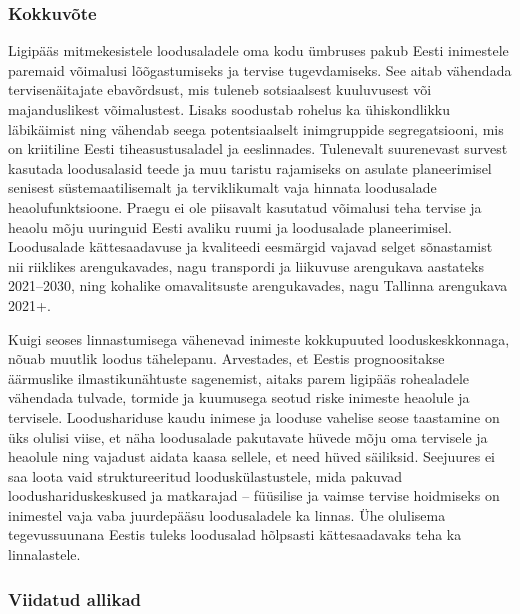 \documentclass[estonian,]{article}
\begin{document}
\hypertarget{kokkuvuxf5te-8}{%
\subsubsection*{Kokkuvõte}\label{kokkuvuxf5te-8}}

Ligipääs mitmekesistele loodusaladele oma kodu ümbruses pakub Eesti inimestele paremaid võimalusi lõõgastumiseks ja tervise tugevdamiseks. See aitab vähendada tervisenäitajate ebavõrdsust, mis tuleneb sotsiaalsest kuuluvusest või majanduslikest võimalustest. Lisaks soodustab rohelus ka ühiskondlikku läbikäimist ning vähendab seega potentsiaalselt inimgruppide segregatsiooni, mis on kriitiline Eesti tiheasustusaladel ja eeslinnades. Tulenevalt suurenevast survest kasutada loodusalasid teede ja muu taristu rajamiseks on asulate planeerimisel senisest süstemaatilisemalt ja terviklikumalt vaja hinnata loodusalade heaolufunktsioone. Praegu ei ole piisavalt kasutatud võimalusi teha tervise ja heaolu mõju uuringuid Eesti avaliku ruumi ja loodusalade planeerimisel. Loodusalade kättesaadavuse ja kvaliteedi eesmärgid vajavad selget sõnastamist nii riiklikes arengukavades, nagu transpordi ja liikuvuse arengukava aastateks 2021--2030, ning kohalike omavalitsuste arengukavades, nagu Tallinna arengukava 2021+.

Kuigi seoses linnastumisega vähenevad inimeste kokkupuuted looduskeskkonnaga, nõuab muutlik loodus tähelepanu. Arvestades, et Eestis prognoositakse äärmuslike ilmastikunähtuste sagenemist, aitaks parem ligipääs rohealadele vähendada tulvade, tormide ja kuumusega seotud riske inimeste heaolule ja tervisele. Loodushariduse kaudu inimese ja looduse vahelise seose taastamine on üks olulisi viise, et näha loodusalade pakutavate hüvede mõju oma tervisele ja heaolule ning vajadust aidata kaasa sellele, et need hüved säiliksid. Seejuures ei saa loota vaid struktureeritud looduskülastustele, mida pakuvad loodushariduskeskused ja matkarajad -- füüsilise ja vaimse tervise hoidmiseks on inimestel vaja vaba juurdepääsu loodusaladele ka linnas. Ühe olulisema tegevussuunana Eestis tuleks loodusalad hõlpsasti kättesaadavaks teha ka linnalastele.

\hypertarget{viidatud-allikad-13}{%
\subsubsection*{Viidatud allikad}\label{viidatud-allikad-13}}
\end{document}
